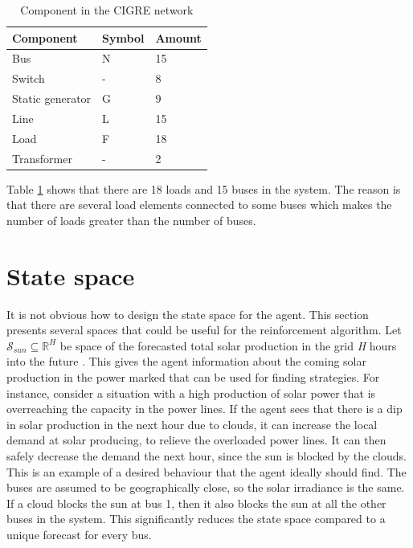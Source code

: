 \documentclass[class=book, crop=false]{standalone}
\begin{document}
\begin{table}[ht]
\centering
\caption{Component in the CIGRE network}
\label{table:cigre_components}
\begin{tabular}{l|ll}

Component  & Symbol & Amount 
\\ 
\hline
Bus & N & 15 \\
Switch & - & 8 \\
Static generator & G & 9 \\ 
Line & L & 15 \\
Load & F & 18 \\
Transformer &- & 2

 \\
\hline
\end{tabular}
\end{table}
Table \ref{table:cigre_components} shows that there are 18 loads and 15 buses in the system. The reason is that there are several load elements connected to some buses which makes the number of loads greater than the number of buses.  



\section{State space}\label{section:problem:state_space}
It is not obvious how to design the state space for the agent. This section presents several spaces that could be useful for the reinforcement algorithm. Let $\mathcal{S}_{sun} \subseteq  \mathbb{R}^{H}$ be space of the forecasted total solar production in the grid \textit{H} hours into the future . This gives the agent information about the coming solar production in the power marked that can be used for finding strategies. For instance, consider a situation with a high production of solar power that is overreaching the capacity in the power lines. If the agent sees that there is a dip in solar production in the next hour due to clouds, it can increase the local demand at solar producing, to relieve the overloaded power lines. It can then safely decrease the demand the next hour, since the sun is blocked by the clouds. This is an example of a desired behaviour that the agent ideally should find. The buses are assumed to be geographically close, so the solar irradiance is the same. If a cloud blocks the sun at bus 1, then it also blocks the sun at all the other buses in the system. This significantly reduces the state space compared to a unique forecast for every bus. 
\end{document}

